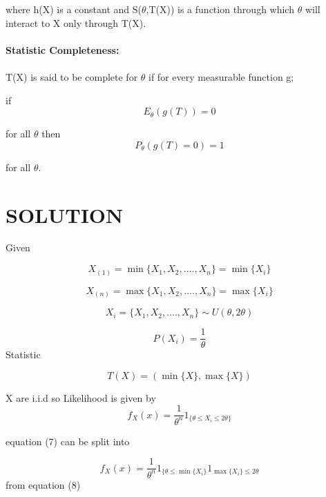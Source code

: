 \documentclass[journal,12pt,twocolumn]{IEEEtran}
\begin{document}
where h(X) is a constant and S($\theta$,T(X)) is a function through which $\theta$ will interact to X only through T(X).\\ \\

\textbf{Statistic Completeness:}\\ \\
T(X) is said to be complete for $\theta$ if for every measurable function g;

if 
\begin{equation}
    {E_\theta}(g(T))=0 
\end{equation}

for all $\theta$ then
\begin{equation}
    P_\theta(g(T)=0)=1 
\end{equation}

for all $\theta$.\\
\section{\textbf{SOLUTION}}
Given

\begin{equation}
    X_{(1)} =\min\{X_1,X_2,....,X_n\}=\min\{X_i\}
\end{equation}

\begin{equation}
    X_{(n)}=\max\{X_1,X_2,....,X_n\}=\max\{X_i\}
\end{equation}

\begin{equation}
    X_i=\{X_1,X_2,....,X_n\}\sim U(\theta,2\theta)
\end{equation}

\begin{equation}
    P(X_i)=\dfrac{1}{\theta}
\end{equation}
Statistic

\begin{equation}
    T(X)=(\min\{X\},\max\{X\})
\end{equation}

X are i.i.d so Likelihood is given by 
\begin{equation}
    f_X(x)=\frac{1}{\theta^n}1_{\{\theta\leq X_i \leq2\theta\}}
\end{equation}

equation (7) can be split into

\begin{equation}
    f_X(x)=\frac{1}{\theta^n}1_{\{\theta\leq \min\{X_i\}}1_{\max\{ X_i\}\leq2\theta}
\end{equation}
from equation (8) 
\end{document}
